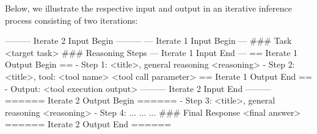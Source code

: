Below, we illustrate the respective input and output in an iterative inference process consisting of two iterations:
\begin{tcolorbox}[colback=gray!5!white, colframe=gray!75!black, 
title=Interactive Inference, boxrule=0.3mm, width=0.49\textwidth, arc=3mm, auto outer arc=true]
--------- Iterate 2 Input Begin ---------\newline
\newline
--- Iterate 1 Input Begin ---\newline
\#\#\# Task\newline
<target task>\newline
\#\#\# Reasoning Steps\newline
--- Iterate 1 Input End ---\newline
\newline
== Iterate 1 Output Begin ==\newline
- Step 1: <title>, general reasoning\newline
<reasoning>\newline
- Step 2: <title>, tool: <tool name>\newline
<tool call parameter>\newline
== Iterate 1 Output End ==\newline
- Output: <tool execution output>\newline
\newline
--------- Iterate 2 Input End ---------\newline
\newline
====== Iterate 2 Output Begin ======\newline
- Step 3: <title>, general reasoning\newline
<reasoning>\newline
- Step 4: ...\newline
...\newline
...\newline
\#\#\# Final Response\newline
<final answer>\newline
====== Iterate 2 Output End ======\newline
\end{tcolorbox}


